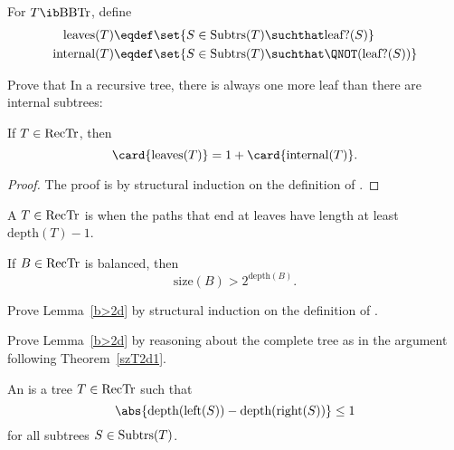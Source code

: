 \begin{problem}
For $T \ib \brnch$, define
\begin{align*}
\text{leaves}(T)   & \eqdef \set{S \in \subbrn{T} \suchthat \leafp{(S)}}\\
\text{internal}(T) & \eqdef \set{S \in \subbrn{T} \suchthat \QNOT(\leafp{(S)})}\\
\end{align*}

Prove that In a recursive tree, there is always one more leaf than
there are internal subtrees:

\begin{lemma*}
If $T \in \text{RecTr}$, then
\[
\card{\text{leaves}(T)} = 1 + \card{\text{internal}(T)}.
\]
\end{lemma*}
\begin{solution}

\begin{proof}
The proof is by structural induction on the definition of \rectr.

\end{proof} 
\end{solution}
\end{problem}

A $T \in \text{RecTr}$ is  when the paths that end at leaves
have length at least $\text{depth}(T) - 1$.

\begin{lemma}\label{b>2d}
If $B \in \text{RecTr}$ is balanced, then
\[
\text{size}(B) > 2^{\text{depth}(B)}.
\]
\end{lemma}

\begin{problem}
Prove Lemma~\ref{b>2d} by structural induction on the definition of \rectr.

\begin{solution}
\end{solution}
\end{problem}

\begin{problem}
Prove Lemma~\ref{b>2d} by reasoning about the complete tree as in the
argument following Theorem~\ref{szT2d1}.

\begin{solution}
\end{solution}
\end{problem}

An  is a tree $T\in \text{RecTr}$ such that
\[
\abs{\text{depth}(\leftsub{(S)}) - \text{depth}(\rightsub{(S)})} \leq 1
\]
for all subtrees $S \in \text{Subtrs}(T)$.

